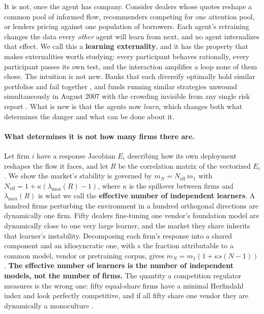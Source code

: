 \documentclass{article}
\theoremstyle{plain}
\theoremstyle{definition}
\newcommand{\Neff}{N_{\mathrm{eff}}}
\newcommand{\mN}{m_N}
\newcommand{\lmax}{\lambda_{\max}}
\begin{document}
It is not, once the agent has company. Consider dealers whose quotes reshape a common pool of informed flow, recommenders competing for one attention pool, or lenders pricing against one population of borrowers. Each agent's retraining changes the data every \emph{other} agent will learn from next, and no agent internalizes that effect. We call this a \textbf{learning externality}, and it has the property that makes externalities worth studying: every participant behaves rationally, every participant passes its own test, and the interaction amplifies a loop none of them chose. The intuition is not new. Banks that each diversify optimally hold similar portfolios and fail together \citep{beale2011,wagner2010}, and funds running similar strategies unwound simultaneously in August 2007 with the crowding invisible from any single risk report \citep{khandani2007}. What is new is that the agents now \emph{learn}, which changes both what determines the danger and what can be done about it.

\paragraph{What determines it is not how many firms there are.}
Let firm $i$ have a response Jacobian $E_i$ describing how its own deployment reshapes the flow it faces, and let $R$ be the correlation matrix of the vectorized $E_i$. We show the market's stability is governed by $\mN = \Neff\, m_1$ with $\Neff = 1 + \kappa(\lmax(R)-1)$, where $\kappa$ is the spillover between firms and $\lmax(R)$ is what we call the \textbf{effective number of independent learners}. A hundred firms perturbing the environment in a hundred orthogonal directions are dynamically one firm. Fifty dealers fine-tuning one vendor's foundation model are dynamically close to one very large learner, and the market they share inherits that learner's instability. Decomposing each firm's response into a shared component and an idiosyncratic one, with $s$ the fraction attributable to a common model, vendor or pretraining corpus, gives $\mN = m_1(1 + \kappa s (N-1))$. \textbf{The effective number of learners is the number of independent models, not the number of firms.} The quantity a competition regulator measures is the wrong one: fifty equal-share firms have a minimal Herfindahl index and look perfectly competitive, and if all fifty share one vendor they are dynamically a monoculture \citep{hirschman1964}.
\end{document}
